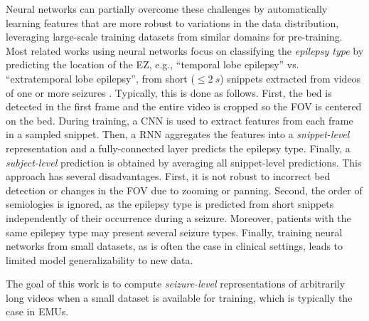 Neural networks can partially overcome these challenges by automatically learning features that are more robust to variations in the data distribution, leveraging large-scale training datasets from similar domains for pre-training.
Most related works using neural networks focus on classifying the \emph{epilepsy type} by predicting the location of the \ac{EZ}, e.g., ``temporal lobe epilepsy'' vs. ``extratemporal lobe epilepsy'', from short ($\le \SI{2}{s}$) snippets extracted from videos of one or more seizures \cite{ahmedt-aristizabal_deep_2018,ahmedt-aristizabal_hierarchical_2018,ahmedt-aristizabal_deep_2018-1,maia_epileptic_2019,karacsony_deep_2020}.
Typically, this is done as follows.
First, the bed is detected in the first frame and the entire video is cropped so the \ac{FOV} is centered on the bed.
During training, a \ac{CNN} is used to extract features from each frame in a sampled snippet.
Then, a \ac{RNN} aggregates the features into a \emph{snippet-level} representation and a fully-connected layer predicts the epilepsy type.
Finally, a \emph{subject-level} prediction is obtained by averaging all snippet-level predictions.
This approach has several disadvantages.
First, it is not robust to incorrect bed detection or changes in the \ac{FOV} due to zooming or panning.
Second, the order of semiologies is ignored, as the epilepsy type is predicted from short snippets independently of their occurrence during a seizure.
Moreover, patients with the same epilepsy type may present several seizure types.
Finally, training neural networks from small datasets, as is often the case in clinical settings, leads to limited model generalizability to new data.

The goal of this work is to compute \emph{seizure-level} representations of arbitrarily long videos when a small dataset is available for training, which is typically the case in \acp{EMU}.

